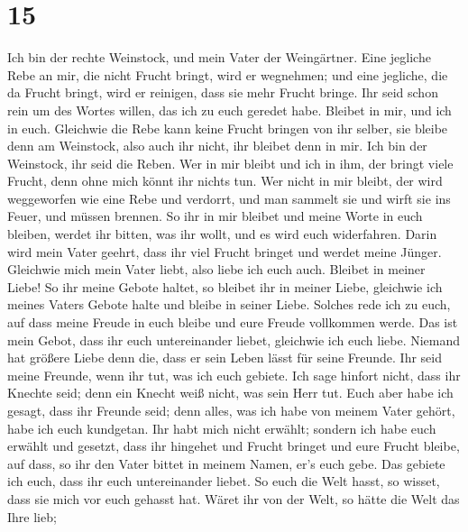 \hypertarget{section-14}{%
\section{15}\label{section-14}}

 Ich bin der rechte Weinstock, und mein Vater der
Weingärtner.  Eine jegliche Rebe an mir, die nicht Frucht
bringt, wird er wegnehmen; und eine jegliche, die da Frucht bringt, wird
er reinigen, dass sie mehr Frucht bringe.  Ihr seid schon
rein um des Wortes willen, das ich zu euch geredet habe. 
Bleibet in mir, und ich in euch. Gleichwie die Rebe kann keine Frucht
bringen von ihr selber, sie bleibe denn am Weinstock, also auch ihr
nicht, ihr bleibet denn in mir.  Ich bin der Weinstock,
ihr seid die Reben. Wer in mir bleibt und ich in ihm, der bringt viele
Frucht, denn ohne mich könnt ihr nichts tun.  Wer nicht in
mir bleibt, der wird weggeworfen wie eine Rebe und verdorrt, und man
sammelt sie und wirft sie ins Feuer, und müssen brennen. 
So ihr in mir bleibet und meine Worte in euch bleiben, werdet ihr
bitten, was ihr wollt, und es wird euch widerfahren. 
Darin wird mein Vater geehrt, dass ihr viel Frucht bringet und werdet
meine Jünger.  Gleichwie mich mein Vater liebt, also liebe
ich euch auch. Bleibet in meiner Liebe!  So ihr meine
Gebote haltet, so bleibet ihr in meiner Liebe, gleichwie ich meines
Vaters Gebote halte und bleibe in seiner Liebe.  Solches
rede ich zu euch, auf dass meine Freude in euch bleibe und eure Freude
vollkommen werde.  Das ist mein Gebot, dass ihr euch
untereinander liebet, gleichwie ich euch liebe.  Niemand
hat größere Liebe denn die, dass er sein Leben lässt für seine Freunde.
 Ihr seid meine Freunde, wenn ihr tut, was ich euch
gebiete.  Ich sage hinfort nicht, dass ihr Knechte seid;
denn ein Knecht weiß nicht, was sein Herr tut. Euch aber habe ich
gesagt, dass ihr Freunde seid; denn alles, was ich habe von meinem Vater
gehört, habe ich euch kundgetan.  Ihr habt mich nicht
erwählt; sondern ich habe euch erwählt und gesetzt, dass ihr hingehet
und Frucht bringet und eure Frucht bleibe, auf dass, so ihr den Vater
bittet in meinem Namen, er's euch gebe.  Das gebiete ich
euch, dass ihr euch untereinander liebet.  So euch die
Welt hasst, so wisset, dass sie mich vor euch gehasst hat.
 Wäret ihr von der Welt, so hätte die Welt das Ihre lieb;
